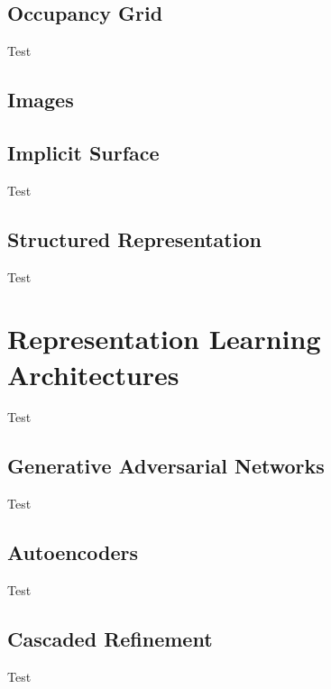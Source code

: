 \subsection{Occupancy Grid}
\label{Occupancy Grid}

Test

\subsection{Images}

\subsection{Implicit Surface}
\label{Implicit Surfaces}

Test

\subsection{Structured Representation}
\label{Structured Representation}

Test


\section{Representation Learning Architectures} \label{Representation Learning}

Test

\subsection{Generative Adversarial Networks}
\label{Generative Adversarial Networks}

Test

\subsection{Autoencoders}
\label{Autoencoders}

Test

\subsection{Cascaded Refinement}
\label{Cascaded Refinement}

Test